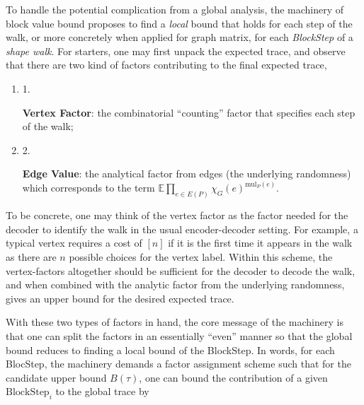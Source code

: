 \documentclass[10pt,a4paper]{article}
\begin{document}
To handle the potential complication from a global analysis, the machinery of block value bound proposes to find a \emph{local} bound that holds for each step of the walk, or more concretely when applied for graph matrix, for each \emph{BlockStep} of a \emph{shape walk}. For starters, one may first unpack the expected trace, and observe that there are two kind of factors contributing to the final expected trace,\par


\begin{enumerate}


\item[] 
1. 


\textbf{Vertex Factor}: the combinatorial “counting” factor that specifies each step of the walk;\par





\item[] 
2. 


\textbf{Edge Value}: the analytical factor from edges (the underlying randomness) which corresponds to the term $\mathbb{E}\prod_{e\in E(P)}\chi_{G}(e)^{\text{mul}_{P}(e)}$.\par





\end{enumerate}




To be concrete, one may think of the vertex factor as the factor needed for the decoder to identify the walk in the usual encoder-decoder setting. For example, a typical vertex requires a cost of $[n]$ if it is the first time it appears in the walk as there are $n$ possible choices for the vertex label. Within this scheme, the vertex-factors altogether should be sufficient for the decoder to decode the walk, and when combined with the analytic factor from the underlying randomness, gives an upper bound for the desired expected trace.\par




With these two types of factors in hand, the core message of the machinery is that one can split the factors in an essentially “even” manner so that the global bound reduces to finding a local bound of the BlockStep. In words, for each BlocStep, the machinery demands a factor assignment scheme such that for the candidate upper bound $B(\tau)$, one can bound the contribution of a given $\text{BlockStep}_{i}$ to the global trace by\par
\end{document}

